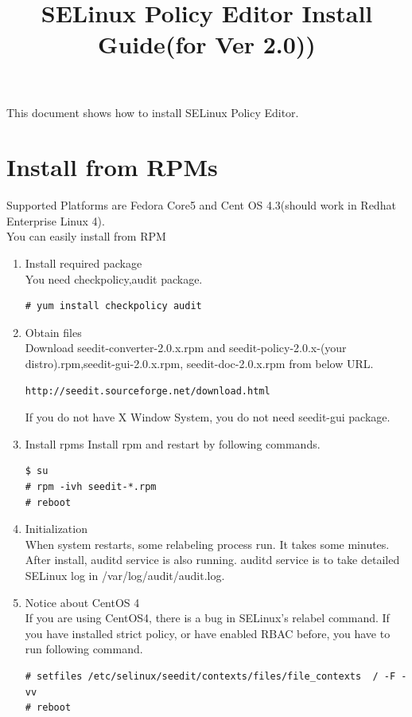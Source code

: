 \documentclass{article}
\title{SELinux Policy Editor Install Guide(for Ver 2.0))}
\begin{document}
\def\labelenumi{(\theenumi)}
\maketitle
\tableofcontents
\newpage

This document shows how to install SELinux Policy Editor.

\section{Install from RPMs}\label{sec:rpm}
Supported Platforms are Fedora Core5 and Cent OS 4.3(should work in Redhat
Enterprise Linux 4).\\

You can easily install from RPM
\begin{enumerate}
 \item Install required package\\
       You need checkpolicy,audit package.
\begin{verbatim}
# yum install checkpolicy audit
\end{verbatim}

    \item Obtain files\\
Download seedit-converter-2.0.x.rpm and seedit-policy-2.0.x-(your
	  distro).rpm,seedit-gui-2.0.x.rpm, seedit-doc-2.0.x.rpm 
from below URL.
\begin{verbatim}
http://seedit.sourceforge.net/download.html
\end{verbatim}
If you do not have X Window System, you do not need seedit-gui package.

 \item Install rpms
Install rpm and restart by following commands.
\begin{verbatim}
$ su 
# rpm -ivh seedit-*.rpm
# reboot
\end{verbatim}
 \item Initialization\\ \label{item:init}
When system restarts, some relabeling process run. It takes some
	  minutes. \\
After install, auditd service is also running. auditd service is to take
     detailed  SELinux log in /var/log/audit/audit.log.


\item Notice about CentOS 4\\ 
If you are using CentOS4, there is a bug in SELinux's relabel command.
If you have installed strict policy, or have enabled RBAC before, 
you have to run following command.
\begin{verbatim}
# setfiles /etc/selinux/seedit/contexts/files/file_contexts  / -F -vv
# reboot
\end{verbatim}


\end{enumerate}
\end{document}
